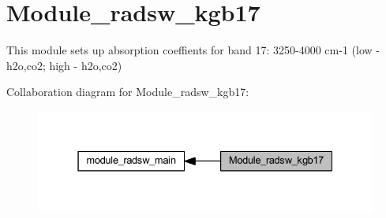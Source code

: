 \hypertarget{group__module__radsw__kgb17}{}\section{Module\+\_\+radsw\+\_\+kgb17}
\label{group__module__radsw__kgb17}


This module sets up absorption coeffients for band 17\+: 3250-\/4000 cm-\/1 (low -\/ h2o,co2; high -\/ h2o,co2)  


Collaboration diagram for Module\+\_\+radsw\+\_\+kgb17\+:\nopagebreak
\begin{figure}[H]
\begin{center}
\leavevmode
\includegraphics[width=331pt]{group__module__radsw__kgb17}
\end{center}
\end{figure}
